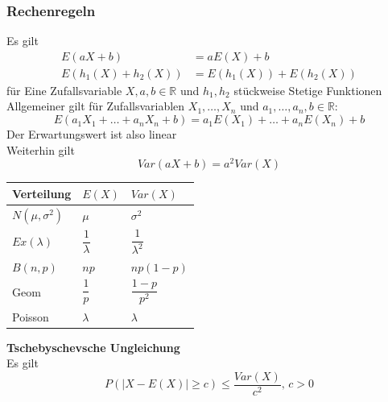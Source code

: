 \documentclass[
	ngerman,
	accentcolor=9c,%
	type=intern,
	marginpar=false
	]{tudapub}
\begin{document}
            \subsubsection{Rechenregeln}
                Es gilt
                \begin{align*}
                    E(aX + b) &= aE(X)+ b\\
                    E(h_1(X)+h_2(X)) &= E(h_1(X))+E(h_2(X))
                \end{align*}
                für Eine Zufallsvariable $X, a, b \in \mathbb{R}$ und $h_1, h_2$ stückweise Stetige Funktionen\\
                Allgemeiner gilt für Zufallsvariablen $X_1,\dots, X_n$ und $a_1, \dots, a_n, b \in \mathbb{R}$:
                \begin{equation*}
                    E(a_1X_1 + \dots + a_nX_n + b) = a_1E(X_1)+\dots+a_nE(X_n) + b
                \end{equation*} 
                Der Erwartungswert ist also linear\\
                Weiterhin gilt
                \begin{equation*}
                    Var(aX + b) = a^2 Var(X)
                \end{equation*}
                \begin{center}
                    \begin{tabular}{l l l}
                        \hline
                        Verteilung & $E(X)$ & $Var(X)$\\
                        \hline
                        $N(\mu, \sigma^2)$ & $\mu$ & $\sigma^2$\\
                        $Ex(\lambda)$ & $\dfrac{1}{\lambda}$ & $\dfrac{1}{\lambda^2}$\\
                        $B(n,p)$ & $np$ & $np(1-p)$\\
                        Geom & $\dfrac{1}{p}$& $\dfrac{1-p}{p^2}$\\
                        Poisson & $\lambda$ & $\lambda$\\
                        \hline
                    \end{tabular}
                \end{center}
                \textbf{Tschebyschevsche Ungleichung}\\
                Es gilt
                \begin{equation*}
                    P(|X-E(X)| \geq c) \leq \dfrac{Var(X)}{c^2}\mbox{, } c>0
                \end{equation*}
\end{document}
